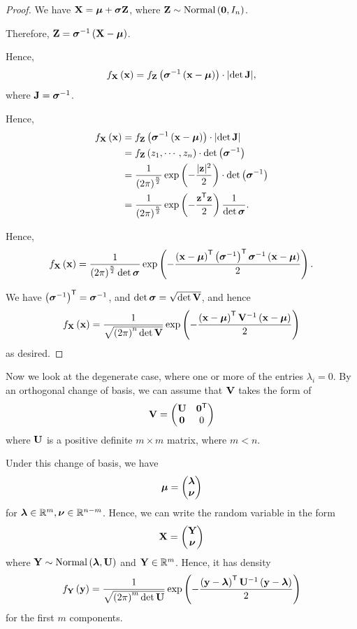 \documentclass{article}
\theoremstyle{definition}
\theoremstyle{remark}
\DeclarePairedDelimiter{\abs}{\lvert}{\rvert}
\newcommand{\RR}{\mathbb{R}}
\newcommand{\inverse}{^{-1}}
\newcommand{\transpose}{^{\mathsf{T}}}
\newcommand{\flatfrac}[2]{\frac{#1}{#2}}
\newcommand{\identityM}{I}
\newcommand{\zeroM}{0}
\newcommand{\pmqty}[1]{\begin{pmatrix}#1\end{pmatrix}}
\newcommand{\Normal}{\operatorname{Normal}}
\begin{document}
\begin{proof}
    We have \(\vb{X} = \vb*{\mu} + \vb*{\sigma} \vb{Z}\), where \(\vb{Z} \sim \Normal\pqty{\vb{0}, \identityM_n}\).

    Therefore, \(\vb{Z} = \vb*{\sigma}\inverse \pqty{\vb{X} - \vb*{\mu}}\).

    Hence,
    \[
        f_{\vb{X}} \pqty{\vb{x}} = f_{\vb{Z}} \pqty{\vb*{\sigma}\inverse \pqty{\vb{x} - \vb*{\mu}}} \cdot \abs{\det \vb{J}},
    \]
    where \(\vb{J} = \vb*{\sigma}\inverse\).

    Hence,
    \begin{align*}
        f_{\vb{X}} \pqty{\vb{x}} &= f_{\vb{Z}} \pqty{\vb*{\sigma}\inverse \pqty{\vb{x} - \vb*{\mu}}} \cdot \abs{\det \vb{J}} \\
        &= f_{\vb{Z}} \pqty{z_1, \cdots, z_n} \cdot \det\pqty{\vb*{\sigma} \inverse} \\
        &= \frac{1}{\pqty{2 \pi}^{\flatfrac{n}{2}}} \exp\pqty{- \frac{\abs{\vb{z}}^2}{2}} \cdot \det\pqty{\vb*{\sigma}\inverse} \\
        &= \frac{1}{\pqty{2 \pi}^{\flatfrac{n}{2}}} \exp\pqty{- \frac{\vb{z}\transpose \vb{z}}{2}} \frac{1}{\det \vb*{\sigma}}.
    \end{align*}

    Hence,
    \[
        f_{\vb{X}}\pqty{\vb{x}} = \frac{1}{\pqty{2 \pi}^{\flatfrac{n}{2}} \det \vb*{\sigma}} \exp\pqty{- \frac{\pqty{\vb{x} - \vb*{\mu}}\transpose \pqty{\vb*{\sigma}\inverse}\transpose \vb*{\sigma}\inverse \pqty{\vb{x} - \vb*{\mu}}}{2}}.
    \]

    We have \(\pqty{\vb*{\sigma}\inverse}\transpose = \vb*{\sigma}\inverse\), and \(\det\vb*{\sigma} = \sqrt{\det \vb{V}}\), and hence
    \[
        f_{\vb{X}}\pqty{\vb{x}} = \frac{1}{\sqrt{\pqty{2\pi}^n \det \vb{V}}} \exp\pqty{- \frac{\pqty{\vb{x} - \vb*{\mu}}\transpose \vb{V}\inverse \pqty{\vb{x} - \vb*{\mu}}}{2}}
    \]
    as desired.
\end{proof}

Now we look at the degenerate case, where one or more of the entries \(\lambda_i = 0\). By an orthogonal change of basis, we can assume that \(\vb{V}\) takes the form of
\[
    \vb{V} = \pmqty{
        \vb{U} & \vb{0}\transpose \\ \vb{0} & \zeroM
    }
\]
where \(\vb{U}\) is a positive definite \(m \times m\) matrix, where \(m < n\).

Under this change of basis, we have
\[
    \vb*{\mu} = \pmqty{\vb*{\lambda} \\ \vb*{\nu}}
\]
for \(\vb*{\lambda} \in \RR^m, \vb*{\nu} \in \RR^{n - m}\). Hence, we can write the random variable in the form
\[
    \vb{X} = \pmqty{\vb{Y} \\ \vb*{\nu}}
\]
where \(\vb{Y} \sim \Normal\pqty{\vb*{\lambda}, \vb{U}}\) and \(\vb{Y} \in \RR^m\). Hence, it has density
\[
    f_{\vb{Y}} \pqty{\vb{y}} = \frac{1}{\sqrt{\pqty{2 \pi}^m \det \vb{U}}} \exp \pqty{- \frac{\pqty{\vb{y} - \vb*{\lambda}}\transpose \vb{U}\inverse \pqty{\vb{y} - \vb*{\lambda}}}{2}}
\]
for the first \(m\) components.
\end{document}
